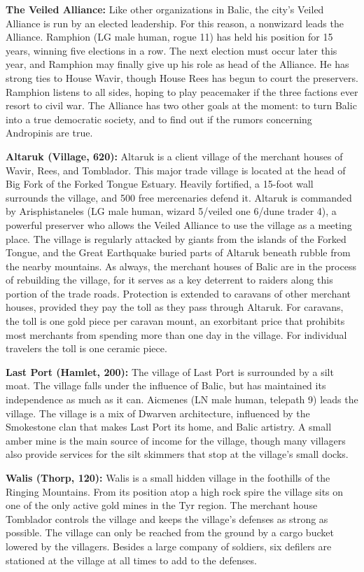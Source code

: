 {	\textbf{The Veiled Alliance:} Like other organizations in Balic, the city's Veiled Alliance is run by an elected leadership. For this reason, a nonwizard leads the Alliance. Ramphion (LG male human, rogue 11) has held his position for 15 years, winning five elections in a row. The next election must occur later this year, and Ramphion may finally give up his role as head of the Alliance. He has strong ties to House Wavir, though House Rees has begun to court the preservers. Ramphion listens to all sides, hoping to play peacemaker if the three factions ever resort to civil war. The Alliance has two other goals at the moment: to turn Balic into a true democratic society, and to find out if the rumors concerning Andropinis are true.
}
{
	\textbf{Altaruk (Village, 620):} Altaruk is a client village of the merchant houses of Wavir, Rees, and Tomblador. This major trade village is located at the head of Big Fork of the Forked Tongue Estuary. Heavily fortified, a 15-foot wall surrounds the village, and 500 free mercenaries defend it. Altaruk is commanded by Arisphistaneles (LG male human, wizard 5/veiled one 6/dune trader 4), a powerful preserver who allows the Veiled Alliance to use the village as a meeting place. The village is regularly attacked by giants from the islands of the Forked Tongue, and the Great Earthquake buried parts of Altaruk beneath rubble from the nearby mountains. As always, the merchant houses of Balic are in the process of rebuilding the village, for it serves as a key deterrent to raiders along this portion of the trade roads. Protection is extended to caravans of other merchant houses, provided they pay the toll as they pass through Altaruk. For caravans, the toll is one gold piece per caravan mount, an exorbitant price that prohibits most merchants from spending more than one day in the village. For individual travelers the toll is one ceramic piece.

	\textbf{Last Port (Hamlet, 200):} The village of Last Port is surrounded by a silt moat. The village falls under the influence of Balic, but has maintained its independence as much as it can. Aicmenes (LN male human, telepath 9) leads the village. The village is a mix of Dwarven architecture, influenced by the Smokestone clan that makes Last Port its home, and Balic artistry. A small amber mine is the main source of income for the village, though many villagers also provide services for the silt skimmers that stop at the village's small docks.

	\textbf{Walis (Thorp, 120):} Walis is a small hidden village in the foothills of the Ringing Mountains. From its position atop a high rock spire the village sits on one of the only active gold mines in the Tyr region. The merchant house Tomblador controls the village and keeps the village's defenses as strong as possible. The village can only be reached from the ground by a cargo bucket lowered by the villagers. Besides a large company of soldiers, six defilers are stationed at the village at all times to add to the defenses.
}
